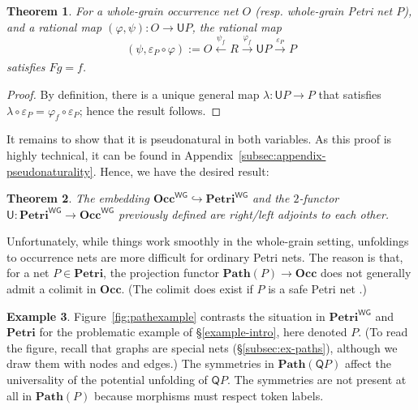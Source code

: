 \documentclass[11pt,a4paper]{article}
\theoremstyle{plain}
\newtheorem{theorem}{Theorem}[section]
\theoremstyle{definition}
\newtheorem{example}[theorem]{Example}
\theoremstyle{remark}
\newcommand{\Occ}{\mathbf{Occ}}
\newcommand{\Petri}{\mathbf{Petri}}
\newcommand{\WGPetri}{\mathbf{Petri}^{\mathsf{WG}}}
\newcommand{\WGOcc}{\mathbf{Occ}^{\mathsf{WG}}}
\newcommand{\U}{\mathsf{U}}
\newcommand{\Q}{\mathsf{Q}}
\newcommand{\Path}{\mathbf{Path}}
\begin{document}
\begin{theorem}
    For a whole-grain occurrence net $O$ (resp. whole-grain Petri net $P$), and a rational map $(\varphi, \psi) : O \rightarrow \U P$, the rational map
    \[
    (\psi, \varepsilon_P \circ \varphi) := O \xleftarrow[]{\psi_f} R \xrightarrow[]{\varphi_f} \U P \xrightarrow[]{\varepsilon_P} P
    \]
    satisfies $Fg = f$.
\end{theorem}
\begin{proof}
    By definition, there is a unique general map $\lambda : \U P \rightarrow P$ that satisfies $\lambda \circ \varepsilon_P = \varphi_f \circ \varepsilon_P$; hence the result follows.
\end{proof}
It remains to show that it is pseudonatural in both variables. As this proof is highly technical, it can be found in Appendix~\ref{subsec:appendix-pseudonaturality}. Hence, we have the desired result:
\color{black} 
\begin{theorem}

 The embedding $\WGOcc \hookrightarrow \WGPetri$ and the $2$-functor $\U :\WGPetri \to \WGOcc$ previously defined are right/left adjoints to each other. 
\end{theorem}
\fi 

Unfortunately, while things work smoothly in the whole-grain setting, unfoldings to occurrence nets are more difficult for ordinary Petri nets. The reason is that, for a net $P \in \Petri$, the projection functor $\Path(P) \to \Occ$ does not generally admit a colimit in $\Occ$.  (The colimit does exist if $P$ is a safe Petri net \cite{GENUN, ES2}.) 

\begin{example} Figure~\ref{fig:pathexample} contrasts the situation in $\WGPetri$ and $\Petri$ for the problematic example of \S\ref{example-intro}, here denoted $P$. (To read the figure, recall that graphs are special nets (\S\ref{subsec:ex-paths}), although we draw them with nodes and edges.) The symmetries in $\Path{(\Q P)}$ affect the universality of the potential unfolding of $\Q P$. The symmetries are not present at all in $\Path{(P)}$ because morphisms must respect token labels. 
\end{example}
\end{document}
